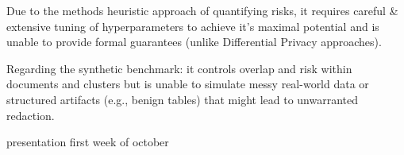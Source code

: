 
Due to the methods heuristic approach of quantifying risks, it requires careful \& extensive tuning of hyperparameters to achieve it's maximal potential and is unable to provide formal guarantees (unlike Differential Privacy approaches). 


Regarding the synthetic benchmark: it controls overlap and risk within documents and clusters but is unable to simulate messy real-world data or structured artifacts (e.g., benign tables) that might lead to  unwarranted redaction.



presentation first week of october


